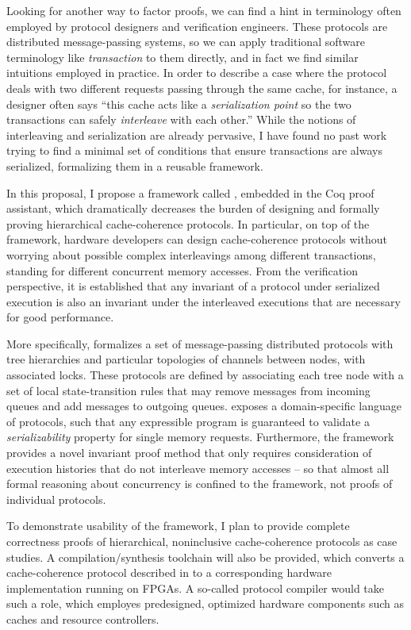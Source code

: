 Looking for another way to factor proofs, we can find a hint in terminology often employed by protocol designers and verification engineers.
These protocols are distributed message-passing systems, so we can apply traditional software terminology like \emph{transaction} to them directly, and in fact we find similar intuitions employed in practice.
In order to describe a case where the protocol deals with two different requests passing through the same cache, for instance, a designer often says ``this cache acts like a \emph{serialization point} so the two transactions can safely \emph{interleave} with each other.''
While the notions of interleaving and serialization are already pervasive, I have found no past work trying to find a minimal set of conditions that ensure transactions are always serialized, formalizing them in a reusable framework.

In this proposal, I propose a framework called \hemiola{}, embedded in the Coq proof assistant, which dramatically decreases the burden of designing and formally proving hierarchical cache-coherence protocols.
In particular, on top of the framework, hardware developers can design cache-coherence protocols without worrying about possible complex interleavings among different transactions, standing for different concurrent memory accesses.
From the verification perspective, it is established that any invariant of a protocol under serialized execution is also an invariant under the interleaved executions that are necessary for good performance.

More specifically, \hemiola{} formalizes a set of message-passing distributed protocols with tree hierarchies and particular topologies of channels between nodes, with associated locks.
These protocols are defined by associating each tree node with a set of local state-transition rules that may remove messages from incoming queues and add messages to outgoing queues.
\hemiola{} exposes a domain-specific language of protocols, such that any expressible program is guaranteed to validate a \emph{serializability} property for single memory requests.
Furthermore, the framework provides a novel invariant proof method that only requires consideration of execution histories that do not interleave memory accesses -- so that almost all formal reasoning about concurrency is confined to the framework, not proofs of individual protocols.

To demonstrate usability of the framework, I plan to provide complete correctness proofs of hierarchical, noninclusive cache-coherence protocols as case studies.
A compilation/synthesis toolchain will also be provided, which converts a cache-coherence protocol described in \hemiola{} to a corresponding hardware implementation running on FPGAs.
A so-called protocol compiler would take such a role, which employes predesigned, optimized hardware components such as caches and resource controllers.


